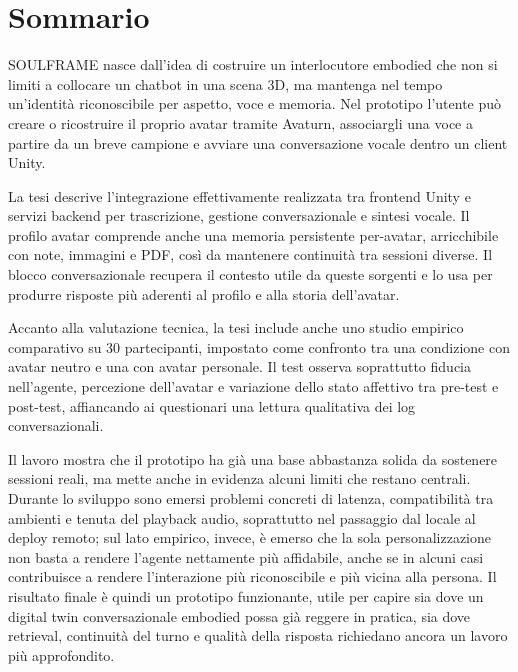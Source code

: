 \chapter*{Sommario}

SOULFRAME nasce dall'idea di costruire un interlocutore embodied che non si limiti a collocare un chatbot in una scena 3D, ma mantenga nel tempo un'identità riconoscibile per aspetto, voce e memoria. Nel prototipo l'utente può creare o ricostruire il proprio avatar tramite Avaturn, associargli una voce a partire da un breve campione e avviare una conversazione vocale dentro un client Unity.

La tesi descrive l'integrazione effettivamente realizzata tra frontend Unity e servizi backend per trascrizione, gestione conversazionale e sintesi vocale. Il profilo avatar comprende anche una memoria persistente per-avatar, arricchibile con note, immagini e PDF, così da mantenere continuità tra sessioni diverse. Il blocco conversazionale recupera il contesto utile da queste sorgenti e lo usa per produrre risposte più aderenti al profilo e alla storia dell'avatar.

Accanto alla valutazione tecnica, la tesi include anche uno studio empirico comparativo su 30 partecipanti, impostato come confronto tra una condizione con avatar neutro e una con avatar personale. Il test osserva soprattutto fiducia nell'agente, percezione dell'avatar e variazione dello stato affettivo tra pre-test e post-test, affiancando ai questionari una lettura qualitativa dei log conversazionali.

Il lavoro mostra che il prototipo ha già una base abbastanza solida da sostenere sessioni reali, ma mette anche in evidenza alcuni limiti che restano centrali. Durante lo sviluppo sono emersi problemi concreti di latenza, compatibilità tra ambienti e tenuta del playback audio, soprattutto nel passaggio dal locale al deploy remoto; sul lato empirico, invece, è emerso che la sola personalizzazione non basta a rendere l'agente nettamente più affidabile, anche se in alcuni casi contribuisce a rendere l'interazione più riconoscibile e più vicina alla persona. Il risultato finale è quindi un prototipo funzionante, utile per capire sia dove un digital twin conversazionale embodied possa già reggere in pratica, sia dove retrieval, continuità del turno e qualità della risposta richiedano ancora un lavoro più approfondito.
